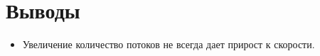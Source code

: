 \section{Выводы}
\begin{itemize}
\item Увеличение количество потоков не всегда дает прирост к скорости.
\end{itemize}
\pagebreak